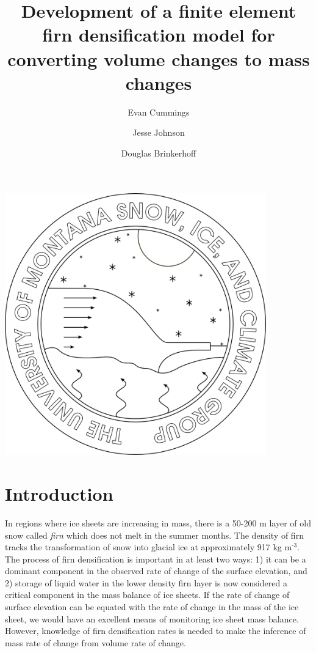 \documentclass{article}%
\newcommand{\sups}[1]{\ensuremath{^{\textrm{#1}}}}
\begin{document}

\title{Development of a finite element firn densification model for converting volume changes to mass changes}
\author{Evan Cummings \and Jesse Johnson \and Douglas Brinkerhoff}
\maketitle
\begin{center}
\includegraphics[width=4.455666122085252in]{images/logoPlain.png}
\end{center}

\twocolumn


\section{Introduction}


In regions where ice sheets are increasing in mass, there is a 50-200 m layer of old snow called \emph{firn} which does not melt in the summer months.  The density of firn tracks the transformation of snow into glacial ice at approximately 917 kg m\sups{-3}.  The process of firn densification is important in at least two ways: 1) it can be a dominant component in the observed rate of change of the surface elevation, and 2) storage of liquid water in the lower density firn layer is now considered a critical component in the mass balance of ice sheets.  If the rate of change of surface elevation can be equated with the rate of change in the mass of the ice sheet, we would have an excellent means of monitoring ice sheet mass balance.  However, knowledge of firn densification rates is needed to make the inference of mass rate of change from volume rate of change.
\end{document}
